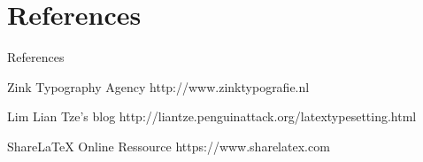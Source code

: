 \documentclass{beamer}
\begin{document}
\section*{References}
\begin{frame}{References}
	\begin{thebibliography}{10}
    \beamertemplateonlinebibitems
    Zink Typography Agency
		\newblock http://www.zinktypografie.nl

    \beamertemplateonlinebibitems
    Lim Lian Tze's blog
		\newblock http://liantze.penguinattack.org/latextypesetting.html

    \beamertemplateonlinebibitems
    Share{\rmfamily\LaTeX{}} Online Ressource
		\newblock https://www.sharelatex.com
    \end{thebibliography}
\end{frame}
\end{document}
